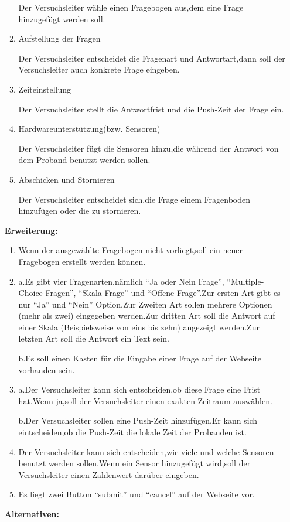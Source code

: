 \documentclass[a4paper]{scrreprt}
\begin{document}
\begin{itemize}
\begin{enumerate}
                            \par Der Versuchsleiter wähle einen Fragebogen aus,dem eine Frage hinzugefügt werden soll.
                            \item Aufstellung der Fragen
                            \par Der Versuchsleiter entscheidet die Fragenart und Antwortart,dann soll der Versuchsleiter auch konkrete Frage eingeben.
                            \item Zeiteinstellung
                            \par Der Versuchsleiter stellt die Antwortfrist und die Push-Zeit der Frage ein.
                            \item Hardwareunterstützung(bzw. Sensoren)
                            \par Der Versuchsleiter fügt die Sensoren hinzu,die während der Antwort von dem Proband benutzt werden sollen.
                            \item Abschicken und Stornieren
                            \par Der Versuchsleiter entscheidet sich,die Frage einem Fragenboden hinzufügen oder die zu stornieren.
		            	\end{enumerate}
	            	\par \textbf{Erweiterung: }
                            \begin{enumerate}
                            \item Wenn der ausgewählte Fragebogen nicht vorliegt,soll ein neuer Fragebogen erstellt werden können.
                            \item a.Es gibt vier Fragenarten,nämlich ``Ja oder Nein Frage'', ``Multiple-Choice-Fragen'', ``Skala Frage'' und ``Offene Frage''.Zur ersten Art gibt es nur ``Ja'' und ``Nein'' Option.Zur Zweiten Art sollen mehrere Optionen (mehr als zwei) eingegeben werden.Zur dritten Art soll die Antwort  auf einer Skala (Beispielsweise von eins bis zehn) angezeigt werden.Zur letzten Art soll die Antwort ein Text sein.
                                \par b.Es soll einen Kasten für die Eingabe einer Frage auf der Webseite vorhanden sein.
                            \item a.Der Versuchsleiter kann sich entscheiden,ob diese Frage eine Frist hat.Wenn ja,soll der Versuchsleiter  einen exakten Zeitraum auswählen.
                                \par b.Der Versuchsleiter sollen eine Push-Zeit hinzufügen.Er kann sich eintscheiden,ob die Push-Zeit die lokale Zeit der Probanden ist.
                            \item Der Versuchsleiter kann sich entscheiden,wie viele und welche Sensoren benutzt werden sollen.Wenn ein Sensor hinzugefügt wird,soll der Versuchsleiter einen Zahlenwert dar\"uber eingeben.
                            \item Es liegt zwei Button ``submit'' und ``cancel'' auf der Webseite vor.
                            \end{enumerate}
	            	\par \textbf{Alternativen: }
	

\end{itemize}
\end{document}

